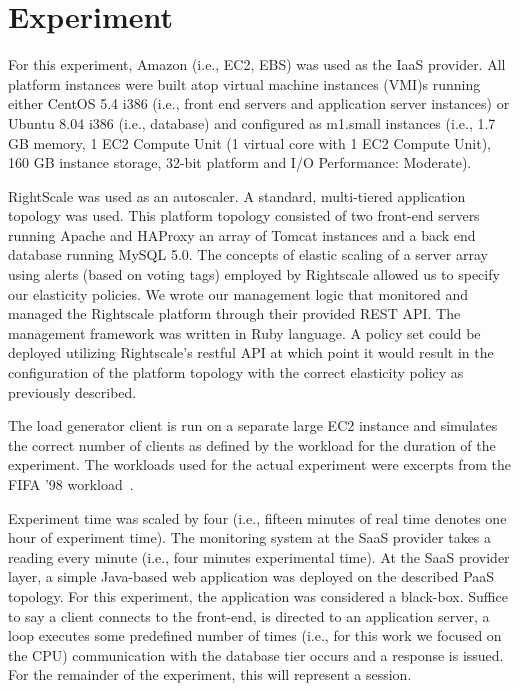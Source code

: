   \section{Experiment}
	\label{s:exp}
 
 For this experiment, Amazon (i.e., EC2, EBS) was used as the IaaS provider. All platform instances were built atop virtual machine instances (VMI)s running either CentOS 5.4 i386 (i.e., front end servers and application server instances) or Ubuntu 8.04 i386 (i.e., database) and configured as m1.small instances (i.e., 1.7 GB memory, 1 EC2 Compute Unit (1 virtual core with 1 EC2 Compute Unit), 160 GB instance storage, 32-bit platform and I/O Performance: Moderate).
 
  RightScale was used as an autoscaler. A standard, multi-tiered application topology was used. This platform topology consisted of two front-end servers running  Apache and HAProxy an array of Tomcat instances and a back end database running MySQL 5.0. The  concepts of elastic scaling of a server array using alerts (based on voting tags) employed by Rightscale allowed us to specify our elasticity policies. We wrote our management logic that monitored and managed the Rightscale platform through their provided REST API. The management framework was written in Ruby language.
A policy set could be deployed utilizing Rightscale's restful API at which point it would result in the configuration of the platform topology with the correct elasticity policy as previously described.  
 
 The load generator client is run on a separate large EC2 instance and simulates the correct number of clients as defined by the workload for the duration of the experiment. The workloads used for the actual experiment were excerpts from the FIFA '98 workload~\cite{arlitt_workload_2000}.

Experiment time was scaled by four (i.e., fifteen minutes of real time denotes one hour of experiment time).  
The monitoring system at the SaaS provider takes a reading every minute (i.e., four minutes experimental time).
At the SaaS provider layer, a simple Java-based web application was deployed on the described PaaS topology.   For this experiment, the application was considered a black-box. Suffice to say a client connects to the front-end, is directed to an application server, a loop executes some predefined number of times (i.e., for this work we focused on the CPU)  communication with the database tier occurs and a response is issued.  For the remainder of the experiment, this will represent a session.  

